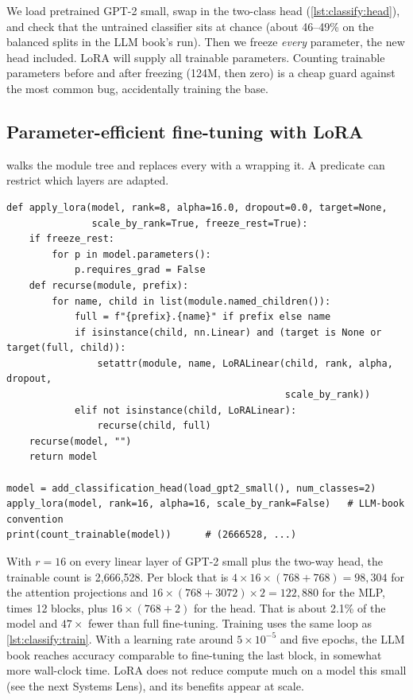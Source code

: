 We load pretrained GPT-2 small, swap in the two-class head
(\cref{lst:classify:head}), and check that the untrained classifier sits at chance
(about 46--49\% on the balanced splits in the LLM book's run). Then we freeze
\emph{every} parameter, the new head included. LoRA will supply all trainable
parameters. Counting trainable parameters before and after freezing (124M, then zero)
is a cheap guard against the most common bug, accidentally training the base.

\subsection{Parameter-efficient fine-tuning with LoRA}

 walks the module tree and replaces every  with a
 wrapping it. A predicate can restrict which layers are adapted.

\begin{lstlisting}[caption={Replacing linear layers with LoRA layers.},label={lst:instruct:applylora}]
def apply_lora(model, rank=8, alpha=16.0, dropout=0.0, target=None,
               scale_by_rank=True, freeze_rest=True):
    if freeze_rest:
        for p in model.parameters():
            p.requires_grad = False
    def recurse(module, prefix):
        for name, child in list(module.named_children()):
            full = f"{prefix}.{name}" if prefix else name
            if isinstance(child, nn.Linear) and (target is None or target(full, child)):
                setattr(module, name, LoRALinear(child, rank, alpha, dropout,
                                                 scale_by_rank))
            elif not isinstance(child, LoRALinear):
                recurse(child, full)
    recurse(model, "")
    return model

model = add_classification_head(load_gpt2_small(), num_classes=2)
apply_lora(model, rank=16, alpha=16, scale_by_rank=False)   # LLM-book convention
print(count_trainable(model))      # (2666528, ...)
\end{lstlisting}

With $r=16$ on every linear layer of GPT-2 small plus the two-way head, the trainable
count is 2{,}666{,}528. Per block that is $4\times16\times(768+768)=98{,}304$ for the
attention projections and $16\times(768+3072)\times2=122{,}880$ for the MLP, times 12
blocks, plus $16\times(768+2)$ for the head. That is about 2.1\% of the model and
$47\times$ fewer than full fine-tuning. Training uses the same loop as
\cref{lst:classify:train}. With a learning rate around $5\times10^{-5}$ and five epochs,
the LLM book reaches accuracy comparable to fine-tuning the last block, in somewhat more
wall-clock time. LoRA does not reduce compute much on a model this small (see the
next Systems Lens), and its benefits appear at scale.

